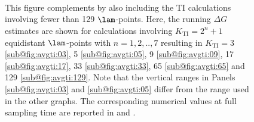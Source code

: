 \begin{figure}[H]
  \centering
   \\[-0.2cm]
   \\[-0.2cm]
   \\[-0.2cm]
   \caption{\footnotesize{}
     This figure complements  
     by also including the TI
     calculations involving fewer than 129 $\lam$-points.
     Here, the running $\Delta G$ estimates are shown for calculations involving
     $K_{\mathrm{TI}}=2^n+1$ equidistant $\lam$-points with $n=1,2,..,7$ resulting in 
     $K_{\mathrm{TI}}=3$ \ref{sub@fig:avgti:03}, %
     5 \ref{sub@fig:avgti:05}, %
     9 \ref{sub@fig:avgti:09}, %
     17 \ref{sub@fig:avgti:17}, %
     33 \ref{sub@fig:avgti:33}, %
     65 \ref{sub@fig:avgti:65} and %
     129 \ref{sub@fig:avgti:129}. %
     Note that the vertical ranges in Panels \ref{sub@fig:avgti:03} and \ref{sub@fig:avgti:05}
     differ from the range used in the other graphs. The corresponding numerical values at full
     sampling time are reported in  and .
   }
   \label{fig:avgti}
\end{figure}



